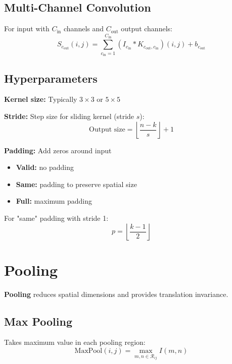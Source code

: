 \subsection{Multi-Channel Convolution}

For input with $C_{\text{in}}$ channels and $C_{\text{out}}$ output channels:
\begin{equation}
S_{c_{\text{out}}}(i,j) = \sum_{c_{\text{in}}=1}^{C_{\text{in}}} (I_{c_{\text{in}}} * K_{c_{\text{out}}, c_{\text{in}}})(i,j) + b_{c_{\text{out}}}
\end{equation}

\subsection{Hyperparameters}

\textbf{Kernel size:} Typically $3 \times 3$ or $5 \times 5$

\textbf{Stride:} Step size for sliding kernel (stride $s$):
\begin{equation}
\text{Output size} = \left\lfloor \frac{n - k}{s} \right\rfloor + 1
\end{equation}

\textbf{Padding:} Add zeros around input
\begin{itemize}
    \item \textbf{Valid:} no padding
    \item \textbf{Same:} padding to preserve spatial size
    \item \textbf{Full:} maximum padding
\end{itemize}

For "same" padding with stride 1:
\begin{equation}
p = \left\lfloor \frac{k-1}{2} \right\rfloor
\end{equation}

\section{Pooling}
\label{sec:pooling}

\textbf{Pooling} reduces spatial dimensions and provides translation invariance.

\subsection{Max Pooling}

Takes maximum value in each pooling region:
\begin{equation}
\text{MaxPool}(i,j) = \max_{m,n \in \mathcal{R}_{ij}} I(m,n)
\end{equation}

